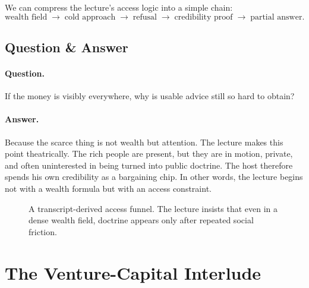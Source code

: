 We can compress the lecture's access logic into a simple chain:
\begin{equation}
\text{wealth field}
\;\to\;
\text{cold approach}
\;\to\;
\text{refusal}
\;\to\;
\text{credibility proof}
\;\to\;
\text{partial answer}.
\end{equation}

\subsection{Question \& Answer}

\paragraph{Question.} If the money is visibly everywhere, why is usable advice still so hard to obtain?

\paragraph{Answer.} Because the scarce thing is not wealth but attention. The lecture makes this point theatrically. The rich people are present, but they are in motion, private, and often uninterested in being turned into public doctrine. The host therefore spends his own credibility as a bargaining chip. In other words, the lecture begins not with a wealth formula but with an access constraint.

\begin{figure}[h]
\centering
{}
\caption{A transcript-derived access funnel. The lecture insists that even in a dense wealth field, doctrine appears only after repeated social friction.}
\end{figure}

\section{The Venture-Capital Interlude}


